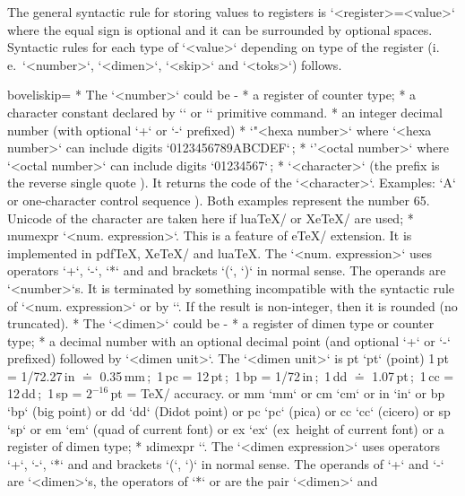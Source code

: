 {The general syntactic rule for storing values to registers is 
`<register>=<value>` where the equal sign is optional and it can be surrounded by
optional spaces. Syntactic rules for each type of `<value>` depending on
type of the register (i.\,e.\ `<number>`, `<dimen>`, `<skip>` and `<toks>`) follows.

\begitems \let\_aboveliskip=\relax 
* The `<number>` could be 
\begitems \style -
* a register of counter type;
* a character constant declared by \x`\chardef` or \x`\mathchardef` primitive command. 
* an integer decimal number (with optional `+` or `-` prefixed)
* {\let\,=\relax `"<hexa number>`} where `<hexa number>` can include digits
  `0123456789ABCDEF`\,;
* {\let\,=\relax`'<octal number>`} where `<octal number>` can include digits 
  `01234567`\,;
* {\let\,=\relax {}`<character>`} (the prefix is the reverse single quote ). 
  It returns the code of the `<character>`. Examples:
  `A` or one-character control sequence ).
  Both examples represent the number 65. Unicode of the character 
  are taken here if lua\TeX/ or Xe\TeX/ are used;
* \i numexpr `\numexpr<num. expression>`.\fnote
  {This is a feature of e\TeX/ extension. It is implemented in pdf\TeX, Xe\TeX/ and lua\TeX.}
  The `<num. expression>` uses operators `+`, `-`, `*` and \code{/} and
  brackets `(`, `)` in normal sense. The operands are `<number>`s. It
  is terminated by something incompatible with
  the syntactic rule of `<num. expression>` or by `\relax`.
  If the result is non-integer, then it is rounded (no truncated).
\enditems
* The `<dimen>` could be
\begitems \style -
* a register of dimen type or counter type;
* a decimal number with an optional decimal point (and optional `+` or `-`
  prefixed) followed by `<dimen unit>`. The `<dimen unit>` is \ii pt `pt` (point)\fnote 
  {1\,pt = 1/72.27\,in $\doteq$ 0.35\,mm\,;\ 1\,pc = 12\,pt\,;\
   1\,bp = 1/72\,in\,;\ 1\,dd $\doteq$ 1.07\,pt\,;\ 1\,cc = 12\,dd\,;\
   1\,sp = $2^{-16}$\,pt = \TeX/ accuracy.}
  or \ii mm `mm` or \ii cm `cm` or \ii in `in` or 
  \ii bp `bp` (big point) or \ii dd `dd` (Didot point) or \ii pc `pc` (pica) or 
  \ii cc `cc` (cicero) or \ii sp `sp` or \ii em `em` (quad of current font) or
  \ii ex `ex` (ex~height of current font) or a register of dimen type;  
* \i dimexpr `\dimexpr<dimen expression>`.
  The `<dimen expression>` uses operators `+`, `-`, `*` and \code{/} and
  brackets `(`, `)` in normal sense. The operands of `+` and `-` are
  `<dimen>`s, the operators of `*` or \code{/} are the pair `<dimen>` and
}
